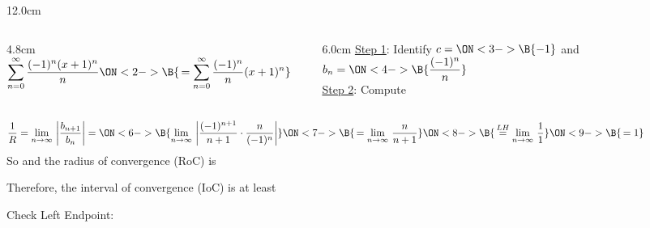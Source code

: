 \begin{frame}
\frametitle{}
\scriptsize

\vspace{0.2cm}

\begin{columns}
\begin{column}{12.0cm}

\begin{columns}
\begin{column}{4.8cm}
	$\displaystyle{\sum \limits_{n=0}^{\infty} \frac{(-1)^n(x+1)^n}{n} \ON<2->{\B{\,= \sum \limits_{n=0}^{\infty} \frac{(-1)^n}{n}(x+1)^n}}}$\\
\end{column}
\begin{column}{6.0cm}
	\underline{Step 1}: Identify \quad $c = \ON<3->{\B{-1}}$ \quad and \quad $\displaystyle{b_{n} = \ON<4->{\B{\frac{(-1)^n}{n}}}}$ \\
	\underline{Step 2}: Compute \\
\end{column}
\end{columns}

\begin{align*}
	\frac{1}{R} = \lim \limits_{n \to \infty}\, \left|\frac{b_{n+1}}{b_{n}} \right|	= 
	\ON<6->{\B{\lim \limits_{n \to \infty}\, \left|\frac{(-1)^{n+1}}{n+1}\cdot\frac{n}{(-1)^n}\right|}}
	\ON<7->{\B{\, = \lim \limits_{n \to \infty}\, \frac{n}{n+1}}}
	\ON<8->{\B{\, \overset{LH}{=} \lim \limits_{n \to \infty}\, \frac{1}{1}}} 
	\ON<9->{\B{\,= 1}} \hspace{2.0cm}
\end{align*}
So \quad {} \quad and the radius of convergence (RoC) is \quad {}  \\

\vspace{0.2cm}

Therefore, the interval of convergence (IoC) is at least 

\vspace{0.2cm}

Check Left Endpoint:  \\

\vspace{0.2cm}


\end{column}
\end{columns}
\end{frame}
